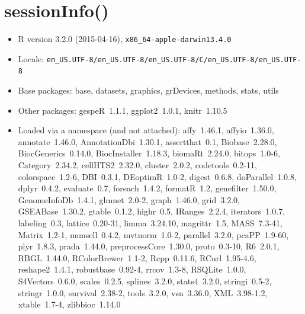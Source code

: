\documentclass{article}\usepackage[]{graphicx}\usepackage[]{color}
\begin{document}
\section{sessionInfo()}
\begin{itemize}\raggedright
  \item R version 3.2.0 (2015-04-16), \verb|x86_64-apple-darwin13.4.0|
  \item Locale: \verb|en_US.UTF-8/en_US.UTF-8/en_US.UTF-8/C/en_US.UTF-8/en_US.UTF-8|
  \item Base packages: base, datasets, graphics, grDevices,
    methods, stats, utils
  \item Other packages: gespeR~1.1.1, ggplot2~1.0.1, knitr~1.10.5
  \item Loaded via a namespace (and not attached): affy~1.46.1,
    affyio~1.36.0, annotate~1.46.0, AnnotationDbi~1.30.1,
    assertthat~0.1, Biobase~2.28.0, BiocGenerics~0.14.0,
    BiocInstaller~1.18.3, biomaRt~2.24.0, bitops~1.0-6,
    Category~2.34.2, cellHTS2~2.32.0, cluster~2.0.2,
    codetools~0.2-11, colorspace~1.2-6, DBI~0.3.1, DEoptimR~1.0-2,
    digest~0.6.8, doParallel~1.0.8, dplyr~0.4.2, evaluate~0.7,
    foreach~1.4.2, formatR~1.2, genefilter~1.50.0,
    GenomeInfoDb~1.4.1, glmnet~2.0-2, graph~1.46.0, grid~3.2.0,
    GSEABase~1.30.2, gtable~0.1.2, highr~0.5, IRanges~2.2.4,
    iterators~1.0.7, labeling~0.3, lattice~0.20-31, limma~3.24.10,
    magrittr~1.5, MASS~7.3-41, Matrix~1.2-1, munsell~0.4.2,
    mvtnorm~1.0-2, parallel~3.2.0, pcaPP~1.9-60, plyr~1.8.3,
    prada~1.44.0, preprocessCore~1.30.0, proto~0.3-10, R6~2.0.1,
    RBGL~1.44.0, RColorBrewer~1.1-2, Rcpp~0.11.6, RCurl~1.95-4.6,
    reshape2~1.4.1, robustbase~0.92-4, rrcov~1.3-8, RSQLite~1.0.0,
    S4Vectors~0.6.0, scales~0.2.5, splines~3.2.0, stats4~3.2.0,
    stringi~0.5-2, stringr~1.0.0, survival~2.38-2, tools~3.2.0,
    vsn~3.36.0, XML~3.98-1.2, xtable~1.7-4, zlibbioc~1.14.0
\end{itemize}
\end{document}
